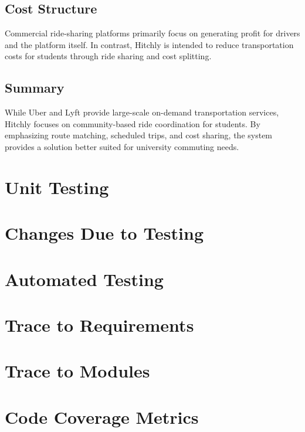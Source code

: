 \documentclass[12pt, titlepage]{article}
\begin{document}
\subsection{Cost Structure}

Commercial ride-sharing platforms primarily focus on generating
profit for drivers and the platform itself. In contrast, Hitchly is
intended to reduce transportation costs for students through ride
sharing and cost splitting.

\subsection{Summary}

While Uber and Lyft provide large-scale on-demand transportation
services, Hitchly focuses on community-based ride coordination for
students. By emphasizing route matching, scheduled trips, and cost
sharing, the system provides a solution better suited for university
commuting needs.


\section{Unit Testing}

\section{Changes Due to Testing}


\section{Automated Testing}
		
\section{Trace to Requirements}
		
\section{Trace to Modules}		

\section{Code Coverage Metrics}
\end{document}
